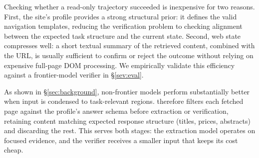 
Checking whether a read-only trajectory succeeded is inexpensive for two reasons. First, the site's profile provides a strong structural prior: it defines the valid navigation templates, reducing the verification problem to checking alignment between the expected task structure and the current state. Second, web state compresses well: a short textual summary of the retrieved content, combined with the URL, is usually sufficient to confirm or reject the outcome without relying on expensive full-page DOM processing. We empirically validate this efficiency against a frontier-model verifier in \S\ref{sev:eval}.





As shown in \S\ref{sec:background}, non-frontier models perform substantially better when input is condensed to task-relevant regions. \sys therefore filters each fetched page against the profile's answer schema before extraction or verification, retaining content matching expected response structure (titles, prices, abstracts) and discarding the rest. This serves both stages: the extraction model operates on focused evidence, and the verifier receives a smaller input that keeps its cost cheap.


